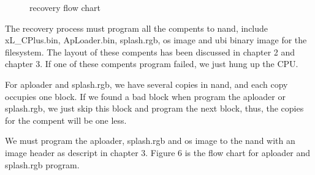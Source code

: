 \documentclass[11pt]{article}
\begin{document}
\begin{figure}[H]
\begin{center}
\caption{recovery flow chart}
\end{center}
\end{figure}

	The recovery process must program all the compents to nand, include xL\_CPlus.bin,
	ApLoader.bin, splash.rgb, os image and ubi binary image for the filesystem. The
	layout of these compents has been discussed in chapter 2 and chapter 3. If one of 
	these compents program failed, we just hung up the CPU.

	For aploader and splash.rgb, we have several copies in nand, and each copy occupies
	one block. If we found a bad block when program the aploader or splash.rgb, we just
	skip this block and program the next block, thus, the copies for the compent will be
	one less.

	We must program the aploader, splash.rgb and os image to the nand with an image header
	as descript in chapter 3. Figure 6 is the flow chart for aploader and splash.rgb program.
\end{document}
